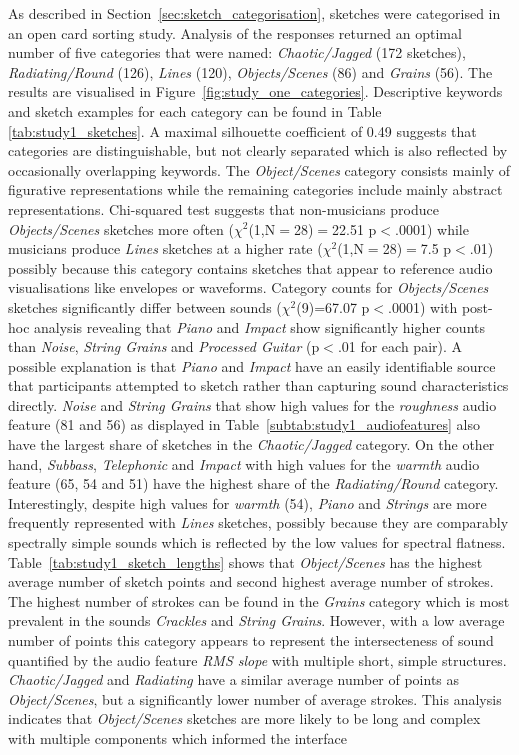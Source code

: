 \documentclass[]{interact}
\theoremstyle{plain}%
\theoremstyle{definition}
\theoremstyle{remark}
\begin{document}
As described in Section~\ref{sec:sketch_categorisation}, sketches were categorised in an open card sorting study. Analysis of the responses returned an optimal number of five categories that were named: \textit{Chaotic/Jagged} (172 sketches), \textit{Radiating/Round} (126), \textit{Lines} (120), \textit{Objects/Scenes} (86) and \textit{Grains} (56). The results are visualised in Figure~\ref{fig:study_one_categories}. Descriptive keywords and sketch examples for each category can be found in Table \ref{tab:study1_sketches}. A maximal silhouette coefficient of 0.49 suggests that categories are distinguishable, but not clearly separated which is also reflected by occasionally overlapping keywords. The \textit{Object/Scenes} category consists mainly of figurative representations while the remaining categories include mainly abstract representations. Chi-squared test suggests that non-musicians produce \textit{Objects/Scenes} sketches more often (${\chi}^2$(1,N$=$28)$=$22.51 p$<$.0001) while musicians produce \textit{Lines} sketches at a higher rate (${\chi}^2$(1,N$=$28)$=$7.5 p$<$.01) possibly because this category contains sketches that appear to reference audio visualisations like envelopes or waveforms. Category counts for \textit{Objects/Scenes} sketches significantly differ between sounds (${\chi}^2$(9)=67.07 p$<$.0001) with post-hoc analysis revealing that \textit{Piano} and \textit{Impact} show significantly higher counts than \textit{Noise}, \textit{String Grains} and \textit{Processed Guitar} (p$<$.01 for each pair). A possible explanation is that \textit{Piano} and \textit{Impact} have an easily identifiable source that participants attempted to sketch rather than capturing sound characteristics directly. \textit{Noise} and \textit{String Grains} that show high values for the \textit{roughness} audio feature (81 and 56) as displayed in Table~\ref{subtab:study1_audiofeatures} also have the largest share of sketches in the \textit{Chaotic/Jagged} category. On the other hand, \textit{Subbass}, \textit{Telephonic} and \textit{Impact} with high values for the \textit{warmth} audio feature (65, 54 and 51) have the highest share of the \textit{Radiating/Round} category.  Interestingly, despite high values for \textit{warmth} (54), \textit{Piano} and \textit{Strings} are more frequently represented with \textit{Lines} sketches, possibly because they are comparably spectrally simple sounds which is reflected by the low values for spectral flatness. Table~\ref{tab:study1_sketch_lengths} shows that \textit{Object/Scenes} has the highest average number of sketch points and second highest average number of strokes. The highest number of strokes can be found in the \textit{Grains} category which is most prevalent in the sounds \textit{Crackles} and \textit{String Grains}. However, with a low average number of points this category appears to represent the intersecteness of sound quantified by the audio feature \textit{RMS slope} with multiple short, simple structures. \textit{Chaotic/Jagged} and \textit{Radiating} have a similar average number of points as \textit{Object/Scenes}, but a significantly lower number of average strokes. This analysis indicates that \textit{Object/Scenes} sketches are more likely to be long and complex with multiple components which informed the interface 
\end{document}
